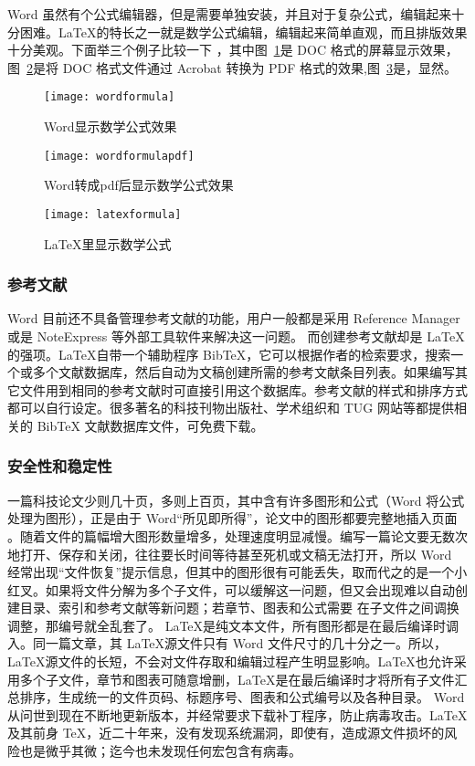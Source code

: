 Word 虽然有个公式编辑器，但是需要单独安装，并且对于复杂公式，编辑起来十分困难。\LaTeX 的特长之一就是数学公式编辑，编辑起来简单直观，而且排版效果十分美观。下面举三个例子比较一下 ，其中图~\ref{fig:xfig3}是 DOC 格式的屏幕显示效果，图~\ref{fig:xfig4}是将 DOC 格式文件通过 Acrobat 转换为 PDF 格式的效果,图~\ref{fig:xfig5}是，显然。
\begin{figure}[H]
  \centering
  \texttt{[image: wordformula]}
  \caption{Word显示数学公式效果}
  \label{fig:xfig3}
\end{figure}
\begin{figure}[H]
  \centering
  \texttt{[image: wordformulapdf]}
  \caption{Word转成pdf后显示数学公式效果}
  \label{fig:xfig4}
\end{figure}
\begin{figure}[H]
  \centering
  \texttt{[image: latexformula]}
  \caption{LaTeX里显示数学公式}
  \label{fig:xfig5}
\end{figure}

\subsubsection{参考文献}
\label{sec:cankaowenxian}

Word 目前还不具备管理参考文献的功能，用户一般都是采用 Reference Manager 或是 NoteExpress 等外部工具软件来解决这一问题。
而创建参考文献却是 \LaTeX 的强项。\LaTeX 自带一个辅助程序 BibTeX，它可以根据作者的检索要求，搜索一个或多个文献数据库，然后自动为文稿创建所需的参考文献条目列表。如果编写其它文件用到相同的参考文献时可直接引用这个数据库。参考文献的样式和排序方式都可以自行设定。很多著名的科技刊物出版社、学术组织和 TUG 网站等都提供相关的 BibTeX 文献数据库文件，可免费下载。

\subsubsection{安全性和稳定性}
\label{sec:anquanwending}

一篇科技论文少则几十页，多则上百页，其中含有许多图形和公式（Word 将公式处理为图形），正是由于 Word“所见即所得”，论文中的图形都要完整地插入页面 。随着文件的篇幅增大图形数量增多，处理速度明显减慢。编写一篇论文要无数次地打开、保存和关闭，往往要长时间等待甚至死机或文稿无法打开，所以 Word 经常出现“文件恢复”提示信息，但其中的图形很有可能丢失，取而代之的是一个小红叉。如果将文件分解为多个子文件，可以缓解这一问题，但又会出现难以自动创建目录、索引和参考文献等新问题；若章节、图表和公式需要 在子文件之间调换调整，那编号就全乱套了。
\LaTeX 是纯文本文件，所有图形都是在最后编译时调入。同一篇文章，其 \LaTeX 源文件只有 Word 文件尺寸的几十分之一。所以，\LaTeX 源文件的长短，不会对文件存取和编辑过程产生明显影响。\LaTeX 也允许采用多个子文件，章节和图表可随意增删，\LaTeX 是在最后编译时才将所有子文件汇总排序，生成统一的文件页码、标题序号、图表和公式编号以及各种目录。
Word 从问世到现在不断地更新版本，并经常要求下载补丁程序，防止病毒攻击。\LaTeX 及其前身 \TeX，近二十年来，没有发现系统漏洞，即使有，造成源文件损坏的风险也是微乎其微；迄今也未发现任何宏包含有病毒。

